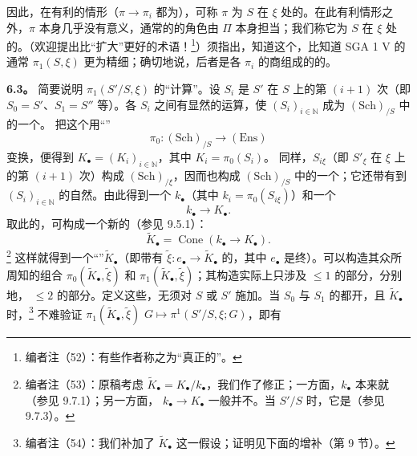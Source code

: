 因此，在有利的情形（$\pi\to\pi_i$ 都为），可称 $\pi$ 为 $S$ 在 $\xi$ 处的。在此有利情形之外，$\pi$ 本身几乎没有意义，通常的的角色由 $\Pi$ 本身担当；我们称它为 $S$ 在 $\xi$ 处的。（欢迎提出比“扩大”更好的术语！\footnote{编者注（52）：有些作者称之为“真正的”。}）须指出，知道这个，比知道 SGA 1 V 的通常 $\pi_1(S,\xi)$ 更为精细；确切地说，后者是各 $\pi_i$ 的商组成的的。

\textbf{6.3。} 简要说明 $\pi_1(S'/S,\xi)$ 的“计算”。设 $S_i$ 是 $S'$ 在 $S$ 上的第 $(i+1)$ 次（即 $S_0=S'$、$S_1=S''$ 等）。各 $S_i$ 之间有显然的运算，使 $(S_i)_{i\in\mathbb N}$ 成为 $(\mathrm{Sch})_{/S}$ 中的一个。
把这个用“”
\[
\pi_0:(\mathrm{Sch})_{/S}\longrightarrow(\mathrm{Ens})
\]
变换，便得到 $K_\bullet=(K_i)_{i\in\mathbb N}$，其中 $K_i=\pi_0(S_i)$。
同样，$S_{i\xi}$（即 $S'_\xi$ 在 $\xi$ 上的第 $(i+1)$ 次）构成 $(\mathrm{Sch})_{/\xi}$，因而也构成 $(\mathrm{Sch})_{/S}$ 中的一个；它还带有到 $(S_i)_{i\in\mathbb N}$ 的自然。由此得到一个 $k_\bullet$（其中 $k_i=\pi_0(S_{i\xi})$）和一个
\[
k_\bullet\longrightarrow K_\bullet.
\]
取此的，可构成一个新的（参见 9.5.1）：
\[
\widetilde K_\bullet=\operatorname{Cone}(k_\bullet\longrightarrow K_\bullet).
\]
\footnote{编者注（53）：原稿考虑 $\widetilde K_\bullet=K_\bullet/k_\bullet$，我们作了修正；一方面，$k_\bullet$ 本来就（参见 9.7.1）；另一方面， $k_\bullet\to K_\bullet$ 一般并不。当 $S'/S$ 时，它是（参见 9.7.3）。} 这样就得到一个“”$\widetilde K_\bullet$（即带有 $\widetilde\xi:e_\bullet\to\widetilde K_\bullet$ 的，其中 $e_\bullet$ 是终）。可以构造其众所周知的组合 $\pi_0(\widetilde K_\bullet,\widetilde\xi)$ 和 $\pi_1(\widetilde K_\bullet,\widetilde\xi)$；其构造实际上只涉及 $\leq1$ 的部分，分别地， $\leq2$ 的部分。定义这些，无须对 $S$ 或 $S'$ 施加。当 $S_0$ 与 $S_1$ 的都开，且 $\widetilde K_\bullet$ 时，\footnote{编者注（54）：我们补加了 $\widetilde K_\bullet$ 这一假设；证明见下面的增补（第 9 节）。} 不难验证 $\pi_1(\widetilde K_\bullet,\widetilde\xi)$  $G\mapsto\pi^1(S'/S,\xi;G)$，即有
